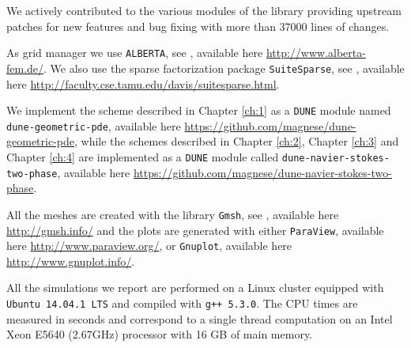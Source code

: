 We actively contributed to the various modules of the library providing
upstream patches for new features and bug fixing with more than 37000 lines of
changes.

As grid manager we use \verb|ALBERTA|, see \cite{Alberta}, available here
\url{http://www.alberta-fem.de/}. We also use the sparse factorization
package \verb|SuiteSparse|, see \cite{Davis04}, available here
\url{http://faculty.cse.tamu.edu/davis/suitesparse.html}.

We implement the scheme described in Chapter \ref{ch:1} as a \verb|DUNE| module
named \verb|dune-geometric-pde|, available here
\url{https://github.com/magnese/dune-geometric-pde}, while the schemes described
in Chapter \ref{ch:2}, Chapter \ref{ch:3} and Chapter \ref{ch:4} are implemented
as a \verb|DUNE| module called \verb|dune-navier-stokes-two-phase|, available
here \url{https://github.com/magnese/dune-navier-stokes-two-phase}.

All the meshes are created with the library \verb|Gmsh|, see
\cite{GeuzaineR09}, available here \url{http://gmsh.info/} and the plots are
generated with either \verb|ParaView|, available here
\url{http://www.paraview.org/}, or \verb|Gnuplot|, available here
\url{http://www.gnuplot.info/}.

All the simulations we report are performed on a Linux cluster equipped with
\verb|Ubuntu 14.04.1 LTS| and compiled with \verb|g++ 5.3.0|. The CPU times
are measured in seconds and correspond to a single thread computation on an
Intel Xeon E5640 (2.67GHz) processor with 16 GB of main memory.
